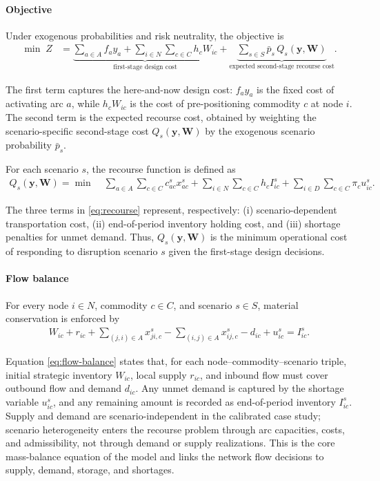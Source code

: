 \documentclass[final,3p,authoryear]{elsarticle}
\theoremstyle{definition}
\newcommand{\arc}[2]{(#1,#2)}
\begin{document}
\paragraph{Objective}
Under exogenous probabilities and risk neutrality, the objective is
\begin{align}
\min \; Z
&=
\underbrace{\sum_{a \in A} f_a y_a
+ \sum_{i \in N}\sum_{c \in C} h_c W_{ic}}_{\text{first-stage design cost}}
+
\underbrace{\sum_{s \in S} \bar p_s \, Q_s(\mathbf y,\mathbf W)}_{\text{expected second-stage recourse cost}}.
\label{eq:obj-rn}
\end{align}

The first term captures the here-and-now design cost: $f_a y_a$ is the
fixed cost of activating arc $a$, while $h_c W_{ic}$ is the cost of
pre-positioning commodity $c$ at node $i$. The second term is the
expected recourse cost, obtained by weighting the scenario-specific
second-stage cost $Q_s(\mathbf y,\mathbf W)$ by the exogenous scenario
probability $\bar p_s$.

For each scenario $s$, the recourse function is defined as
\begin{align}
Q_s(\mathbf y,\mathbf W)
=
\min \;
& \sum_{a \in A}\sum_{c \in C} c_{ac}^s x_{ac}^s
+ \sum_{i \in N}\sum_{c \in C} h_c I_{ic}^s
+ \sum_{i \in D}\sum_{c \in C} \pi_c u_{ic}^s .
\label{eq:recourse}
\end{align}

The three terms in \eqref{eq:recourse} represent, respectively:
(i) scenario-dependent transportation cost,
(ii) end-of-period inventory holding cost, and
(iii) shortage penalties for unmet demand. Thus, $Q_s(\mathbf y,\mathbf W)$
is the minimum operational cost of responding to disruption scenario $s$
given the first-stage design decisions.

\paragraph{Flow balance}
For every node $i \in N$, commodity $c \in C$, and scenario $s \in S$,
material conservation is enforced by
\begin{align}
W_{ic}
+ r_{ic}
+ \sum_{\arc{j}{i}\in A} x_{ji,c}^{s}
- \sum_{\arc{i}{j}\in A} x_{ij,c}^{s}
- d_{ic}
+ u_{ic}^{s}
=
I_{ic}^{s}.
\label{eq:flow-balance}
\end{align}

Equation \eqref{eq:flow-balance} states that, for each
node--commodity--scenario triple, initial strategic inventory $W_{ic}$,
local supply $r_{ic}$, and inbound flow must cover outbound flow and
demand $d_{ic}$. Any unmet demand is captured by the shortage variable
$u_{ic}^s$, and any remaining amount is recorded as end-of-period
inventory $I_{ic}^s$. Supply and demand are scenario-independent in the
calibrated case study; scenario heterogeneity enters the recourse problem
through arc capacities, costs, and admissibility, not through demand or
supply realizations. This is the core mass-balance equation of the model
and links the network flow decisions to supply, demand, storage, and
shortages.
\end{document}
